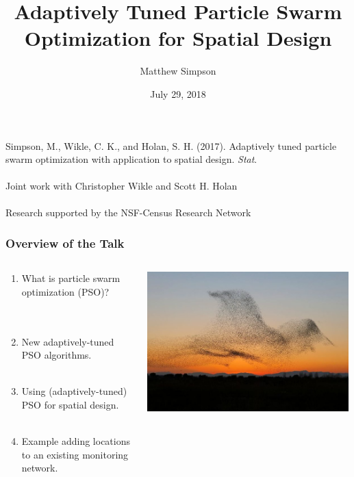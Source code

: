 \documentclass[xcolor=dvipsnames]{beamer}
\title[AT-PSO for Spatial Design]{Adaptively Tuned Particle Swarm Optimization for Spatial Design}
\author[Matt Simpson]{Matthew Simpson}
\institute[Mizzou Stat / SAS]{Department of Statistics, University of Missouri\\
                              SAS Institute, Inc.}
\date{July 29, 2018}
\begin{document}
\begin{frame}
\titlepage
\centering

Simpson, M., Wikle, C. K., and Holan, S. H. (2017). Adaptively tuned particle swarm optimization with application to spatial design. \emph{Stat}.\\~\\

{\scriptsize
Joint work with Christopher Wikle and Scott H. Holan\\~\\
Research supported by the NSF-Census Research Network}
\end{frame}

\begin{frame}
\frametitle{Overview of the Talk}
\begin{columns}
\begin{column}{0.5\textwidth}
\begin{enumerate}
\item What is particle swarm optimization (PSO)?\\
 \citep*{blum2008swarm, clerc2010particle, clerc2011spso}\\~\\
\item New adaptively-tuned PSO algorithms.\\~\\
\item Using (adaptively-tuned) PSO for spatial design.\\~\\
\item Example adding locations to an existing monitoring network.
\end{enumerate}
\end{column}
\begin{column}{0.5\textwidth}
\includegraphics[width = 0.99\textwidth]{birds3.jpg}
\end{column}
\end{columns}
\end{frame}
\end{document}
